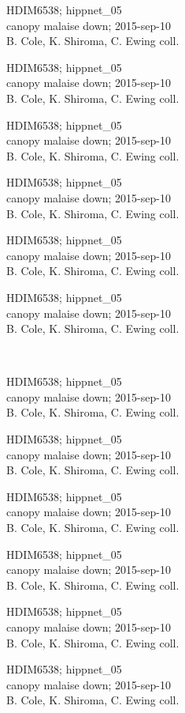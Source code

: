 \documentclass[2pt]{extarticle}
\begin{document}
\noindent
\parbox{0.16\textwidth}{\tiny \raggedright \rule[-0.3\baselineskip]{0pt}{10pt}HDIM6538; hippnet\_05\\ canopy malaise down; 2015-sep-10\\ B. Cole, K. Shiroma, C. Ewing coll.}
\parbox{0.16\textwidth}{\tiny \raggedright \rule[-0.3\baselineskip]{0pt}{10pt}HDIM6538; hippnet\_05\\ canopy malaise down; 2015-sep-10\\ B. Cole, K. Shiroma, C. Ewing coll.}
\parbox{0.16\textwidth}{\tiny \raggedright \rule[-0.3\baselineskip]{0pt}{10pt}HDIM6538; hippnet\_05\\ canopy malaise down; 2015-sep-10\\ B. Cole, K. Shiroma, C. Ewing coll.}
\parbox{0.16\textwidth}{\tiny \raggedright \rule[-0.3\baselineskip]{0pt}{10pt}HDIM6538; hippnet\_05\\ canopy malaise down; 2015-sep-10\\ B. Cole, K. Shiroma, C. Ewing coll.}
\parbox{0.16\textwidth}{\tiny \raggedright \rule[-0.3\baselineskip]{0pt}{10pt}HDIM6538; hippnet\_05\\ canopy malaise down; 2015-sep-10\\ B. Cole, K. Shiroma, C. Ewing coll.}
\parbox{0.16\textwidth}{\tiny \raggedright \rule[-0.3\baselineskip]{0pt}{10pt}HDIM6538; hippnet\_05\\ canopy malaise down; 2015-sep-10\\ B. Cole, K. Shiroma, C. Ewing coll.} \\ 
\vspace{0.001in} 

\noindent
\parbox{0.16\textwidth}{\tiny \raggedright \rule[-0.3\baselineskip]{0pt}{10pt}HDIM6538; hippnet\_05\\ canopy malaise down; 2015-sep-10\\ B. Cole, K. Shiroma, C. Ewing coll.}
\parbox{0.16\textwidth}{\tiny \raggedright \rule[-0.3\baselineskip]{0pt}{10pt}HDIM6538; hippnet\_05\\ canopy malaise down; 2015-sep-10\\ B. Cole, K. Shiroma, C. Ewing coll.}
\parbox{0.16\textwidth}{\tiny \raggedright \rule[-0.3\baselineskip]{0pt}{10pt}HDIM6538; hippnet\_05\\ canopy malaise down; 2015-sep-10\\ B. Cole, K. Shiroma, C. Ewing coll.}
\parbox{0.16\textwidth}{\tiny \raggedright \rule[-0.3\baselineskip]{0pt}{10pt}HDIM6538; hippnet\_05\\ canopy malaise down; 2015-sep-10\\ B. Cole, K. Shiroma, C. Ewing coll.}
\parbox{0.16\textwidth}{\tiny \raggedright \rule[-0.3\baselineskip]{0pt}{10pt}HDIM6538; hippnet\_05\\ canopy malaise down; 2015-sep-10\\ B. Cole, K. Shiroma, C. Ewing coll.}
\parbox{0.16\textwidth}{\tiny \raggedright \rule[-0.3\baselineskip]{0pt}{10pt}HDIM6538; hippnet\_05\\ canopy malaise down; 2015-sep-10\\ B. Cole, K. Shiroma, C. Ewing coll.} \\ 
\vspace{0.001in} 
\end{document}
